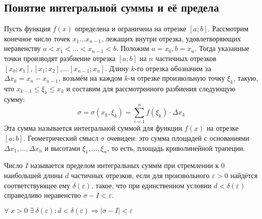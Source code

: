 	\subsection{Понятие интегральной суммы и её предела}
	Пусть функция $f(x)$ определена и ограничена на отрезке $[a;b]$.
	Рассмотрим конечное число точек $x_1\ldots x_{n-1}$, лежащих внутри отрезка,
	удовлетворяющих неравенству $a<x_1<\ldots <x_{n-1}<b$. Положим $a = x_0,
	b = x_n$. Тогда указанные точки производят разбиение отрезка $[a;b]$ на $n$
	частичных отрезков $[x_0;x_1], [x_1;x_2],\ldots [x_{n-1};x_n]$.
	Длину $k$-го отрезка обозначим за $\Delta x_k = x_n - x_{n-1}$, возьмём на
	каждом $k$-м отрезке произвольную точку $\xi_k$, такую, что $x_{k-1}\leq\xi_k
	\leq x_k$ и составим  для рассмотренного разбиения следующую сумму:
	\[
	\sigma = \sigma(x_k,\xi_k) = \sum_{i=1}^{n}f(\xi_k)\cdot\Delta x_k
	\]
	Эта сумма называется интегральной суммой для функции $f(x)$ на отрезке $[a;b]$.
	Геометрический смысл $\sigma$ очевиден: это сумма площадей с основаниями 
	$\Delta x_1,\ldots,\Delta x_n$ и высотами $\xi_1,\ldots,\xi_n$, то есть,
	площадь криволинейной трапеции.
	\begin{Def}
		Число $I$ называется пределом интегральных суммм при стремлении к 0
		наибольшей длины $d$ частичных отрезков, если для произвольного
		$\varepsilon>0$ найдётся соответствующее ему $\delta(\varepsilon)$, такое, что
		при единственном условии $d<\delta(\varepsilon)$ справедливо неравенство
		$\sigma - I < \varepsilon$.
		
		$\forall\; x>0\; \exists\;\delta(\varepsilon)\colon d<\delta(\varepsilon)
		\Rightarrow |\sigma-I|<\varepsilon$
	\end{Def}
	
	
	
	
	
	
	
	
	
	
	
	
	
	
	
	

